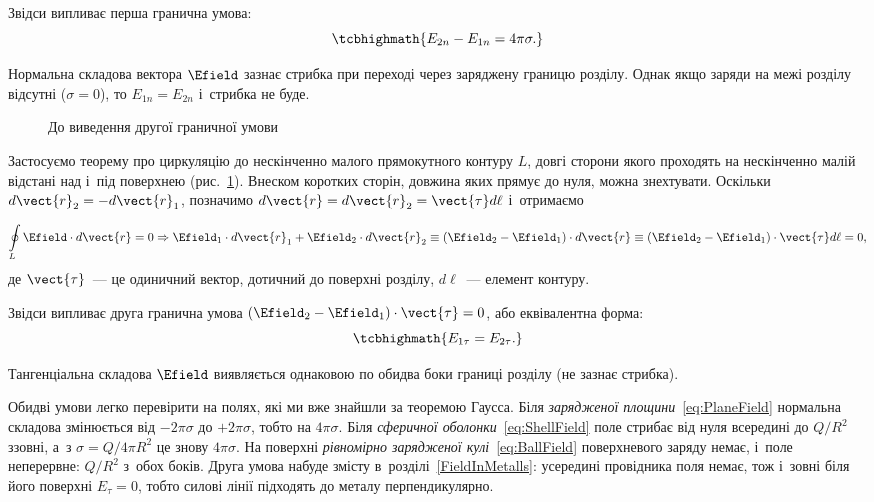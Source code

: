 Звідси випливає перша гранична умова:
\begin{equation}
	\tcbhighmath{
		E_{2n} - E_{1n} = 4\pi\sigma.
	}
\end{equation}

Нормальна складова вектора $\Efield$ зазнає стрибка при переході через заряджену границю
розділу. Однак якщо заряди на межі розділу відсутні ($\sigma = 0$), то $E_{1n} = E_{2n}$
і~стрибка не буде.

\begin{figure}
	\centering
	\caption{До виведення другої граничної умови}%
	\label{tikz:bc2}
\end{figure}
Застосуємо теорему про циркуляцію до нескінченно малого прямокутного контуру $L$, довгі
сторони якого проходять на нескінченно малій відстані над і~під поверхнею
(рис.~\ref{tikz:bc2}). Внеском коротких сторін, довжина яких прямує до нуля, можна
знехтувати. Оскільки $d\vect{r}_2 = - d\vect{r}_1$, позначимо $d\vect{r} =
	d\vect{r}_2 = \vect{\tau} d\ell$ і~отримаємо

\begin{equation*}
	\oint\limits_L \Efield\cdot d\vect{r} = 0 \Rightarrow \Efield_1\cdot d\vect{r}_1 +
	\Efield_2\cdot d\vect{r}_2 \equiv (\Efield_2 - \Efield_1)\cdot d\vect{r} \equiv (\Efield_2 - \Efield_1)\cdot \vect{\tau} d\ell = 0,
\end{equation*}
де $\vect{\tau}$~--- це одиничний вектор, дотичний до поверхні розділу, $d\ell$~---
елемент контуру.

Звідси випливає друга гранична умова $(\Efield_2 - \Efield_1)\cdot \vect{\tau} = 0$, або
еквівалентна форма:
\begin{equation}
	\tcbhighmath{
		E_{1\tau} = E_{2\tau}.
	}
\end{equation}

Тангенціальна складова $\Efield$ виявляється однаковою по обидва боки границі розділу (не
зазнає стрибка).

Обидві умови легко перевірити на полях, які ми вже знайшли за теоремою Гаусса. Біля
\emph{зарядженої площини}~\eqref{eq:PlaneField} нормальна складова змінюється від
$-2\pi\sigma$ до $+2\pi\sigma$, тобто на $4\pi\sigma$. Біля \emph{сферичної
	оболонки}~\eqref{eq:ShellField} поле стрибає від нуля всередині до $Q/R^2$ ззовні, а~з
$\sigma = Q/4\pi R^2$ це знову $4\pi\sigma$. На поверхні \emph{рівномірно зарядженої
	кулі}~\eqref{eq:BallField} поверхневого заряду немає, і~поле неперервне: $Q/R^2$ з~обох
боків. Друга умова набуде змісту в~розділі~\ref{FieldInMetalls}: усередині провідника поля
немає, тож і~зовні біля його поверхні $E_\tau = 0$, тобто силові лінії підходять до
металу перпендикулярно.



